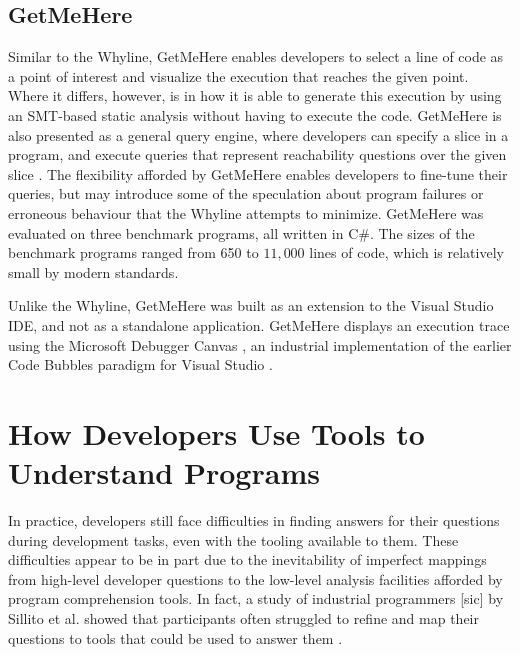 \subsection{GetMeHere}
\label{subsec:GetMeHere}

\par Similar to the Whyline, GetMeHere enables developers to select a line of 
code as a point of interest and visualize the execution that reaches the given 
point.
Where it differs, however, is in how it is able to generate this execution
by using an SMT-based static analysis \cite{barnett-2014-get} without having to
execute the code.
GetMeHere is also presented as a general query engine, where developers can
specify a slice in a program, and execute queries that represent reachability
questions over the given slice \cite{barnett-2014-get}.
The flexibility afforded by GetMeHere enables developers to fine-tune their
queries, but may introduce some of the speculation about program failures or
erroneous behaviour that the Whyline attempts to minimize.
GetMeHere was evaluated on three benchmark programs, all written in C\#.
The sizes of the benchmark programs ranged from 650 to $11,000$ lines of code,
which is relatively small by modern standards.

\par Unlike the Whyline, GetMeHere was built as an extension to the Visual
Studio \ac{IDE}, and not as a standalone application.
GetMeHere displays an execution trace using the Microsoft Debugger Canvas 
\cite{bragdon-2012-canvas}, an industrial implementation of the earlier 
Code Bubbles \cite{bragdon-2010-code-bubbles} paradigm for Visual Studio
\cite{barnett-2014-get}.

\section{How Developers Use Tools to Understand Programs}
\label{sec:HowDevelopersUseToolsToUnderstandPrograms}

\noindent In practice, developers still face difficulties in finding answers 
for their questions during development tasks, even with the tooling available 
to them.
These difficulties appear to be in part due to the inevitability of imperfect 
mappings from high-level developer questions to the low-level analysis 
facilities afforded by program comprehension tools.
In fact, a study of industrial programmers [sic] by Sillito et al. showed that 
participants often struggled to refine and map their questions to tools
that could be used to answer them \cite{sillito-2006-questions-during-task}.

